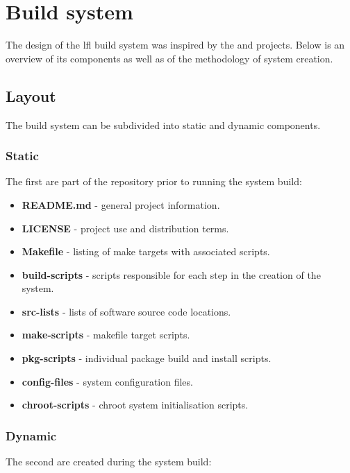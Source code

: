 \section{Build system}\label{Build system}

The design of the \gls{lfl} build system was inspired by the  \cite{mls} and  \cite{mll} projects. Below is an overview of its components as well as of the methodology of system creation.

\subsection{Layout}

The build system can be subdivided into static and dynamic components.

\subsubsection{Static}

The first are part of the repository prior to running the system build:

\begin{itemize}
    \item \textbf{README.md} - general project information.
    \item \textbf{LICENSE} - project use and distribution terms.
    \item \textbf{Makefile} - listing of make targets with associated scripts.
    \item \textbf{build-scripts} - scripts responsible for each step in the creation of the system.
    \item \textbf{src-lists} - lists of software source code locations.
    \item \textbf{make-scripts} - makefile target scripts.
    \item \textbf{pkg-scripts} - individual package build and install scripts.
    \item \textbf{config-files} - system configuration files.
    \item \textbf{chroot-scripts} - chroot system initialisation scripts.
\end{itemize}

\subsubsection{Dynamic}

The second are created during the system build:

